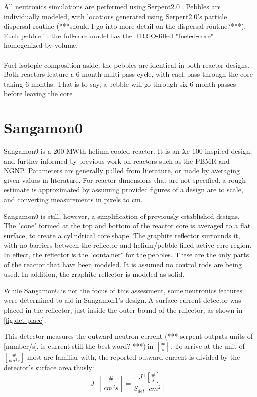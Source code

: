 

All neutronics simulations are performed using Serpent2.0 \cite{leppanenjaakko_serpent_2015} .  Pebbles are individually modeled, with locations generated using Serpent2.0's particle dispersal routine (***should I go into more detail on the dispersal routine?***).  Each pebble in the full-core model has the TRISO-filled "fueled-core" homogenized by volume.
\\




\\
Fuel isotopic composition aside, the pebbles are identical in both reactor designs.  Both reactors feature a 6-month multi-pass cycle, with each pass through the core taking 6 months.  That is to say, a pebble will go through six 6-month passes before leaving the core.

\section{Sangamon0}
Sangamon0 is a 200 MWth helium cooled reactor.  It is an Xe-100 inspired design, and further informed by previous work on reactors such as the PBMR and NGNP.  Parameters are generally pulled from literature, or made by averaging given values in literature.  For reactor dimensions that are not specified, a rough estimate is approximated by assuming provided figures of a design are to scale, and converting measurements in pixels to cm.

Sangamon0 is still, however, a simplification of previously established designs.  The "cone" formed at the top and bottom of the reactor core is averaged to a flat surface, to create a cylindrical core shape.  The graphite reflector surrounds it, with no barriers between the reflector and helium/pebble-filled active core region.  In effect, the reflector is the "container" for the pebbles.  These are the only parts of the reactor that have been modeled.  It is assumed no control rods are being used.  In addition, the graphite reflector is modeled as solid.

While Sangamon0 is not the focus of this assessment, some neutronics features were determined to aid in Sangamon1's design.  A surface current detector was placed in the reflector, just inside the outer bound of the reflector, as shown in \ref{fig:det-place}.



This detector measures the outward neutron current (*** serpent outputs units of [number/s], is current still the best word? ***) in $[\frac{\#}{s}]$.  To arrive at the unit of $[\frac{\#}{cm^2s}]$ most are familiar with, the reported outward current is divided by the detector's surface area thusly:
\begin{equation}
J^+ [\frac{\#}{cm^2s}] = \frac{J^+ [\frac{\#}{s}]}{S_{det}[cm^2]}
\end{equation}

